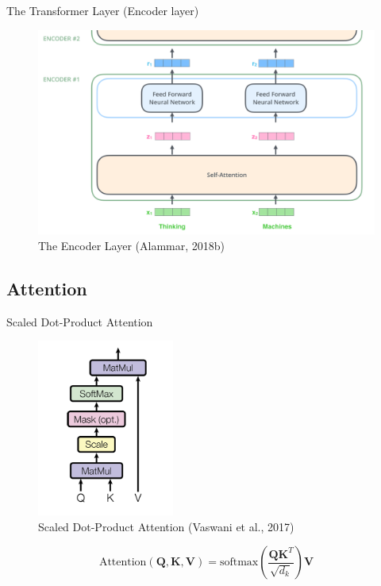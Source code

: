 \documentclass[10pt]{beamer}
\begin{document}
\begin{frame}{The Transformer Layer (Encoder layer)}

\begin{figure}[h]
\centering
\includegraphics[width=1\textwidth]{fig/alammar_encoder_with_tensors_2.png}
\caption{The Encoder Layer (Alammar, 2018b)}
\end{figure}

\end{frame}


\subsection{Attention}

\begin{frame}{Scaled Dot-Product Attention}

\begin{figure}[h]
\centering
\includegraphics[width=0.4\textwidth]{fig/Vaswani_2_scaled_dot.png}
\caption{Scaled Dot-Product Attention (Vaswani et al., 2017)}
\end{figure}
\[
\text{Attention}(\mathbf{Q},\mathbf{K},\mathbf{V}) = \text{softmax}\left(\frac{\mathbf{Q} \mathbf{K}^T}{\sqrt {d_k}}\right) \mathbf{V}
\]

\end{frame}
\end{document}
